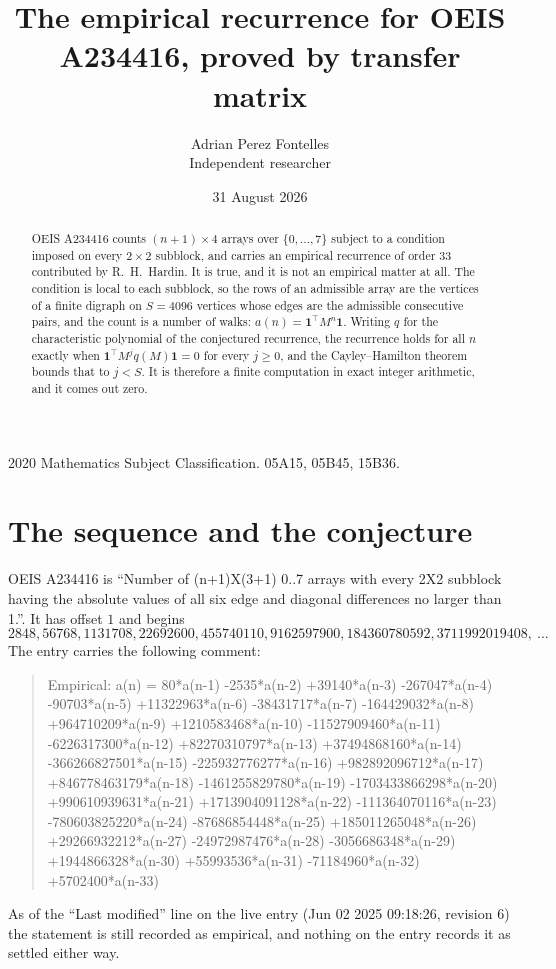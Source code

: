 \documentclass[11pt,a4paper]{article}
\title{The empirical recurrence for OEIS A234416, proved by transfer matrix}
\author{Adrian Perez Fontelles\\ \small Independent researcher}
\date{31 August 2026}
\theoremstyle{plain}
\theoremstyle{definition}
\begin{document}
\maketitle

\begin{abstract}
OEIS A234416 counts $(n+1)\times4$ arrays over $\{0,\dots,7\}$ subject to a condition imposed on
every $2\times2$ subblock, and carries an empirical recurrence of order $33$ contributed
by R.~H.~Hardin. It is true, and it is not an empirical matter at all. The condition is local
to each subblock, so the rows of an admissible array are the vertices of a finite digraph
on $S=4096$ vertices whose edges are the admissible consecutive pairs, and the count is a
number of walks: $a(n)=\mathbf{1}^{\!\top}M^{n}\mathbf{1}$. Writing $q$
for the characteristic polynomial of the conjectured recurrence, the recurrence holds for all
$n$ exactly when $\mathbf{1}^{\!\top}M^{j}q(M)\mathbf{1}=0$ for every $j\ge0$, and the
Cayley--Hamilton theorem bounds that to $j<S$. It is therefore a finite computation in exact
integer arithmetic, and it comes out zero.
\end{abstract}

\noindent\small 2020 Mathematics Subject Classification. 05A15, 05B45, 15B36.\normalsize

\section{The sequence and the conjecture}

OEIS A234416 is ``Number of (n+1)X(3+1) 0..7 arrays with every 2X2 subblock having the absolute values of all six edge and diagonal differences no larger than 1.''. It has offset $1$ and begins
\[
2848, 56768, 1131708, 22692600, 455740110, 9162597900, 184360780592, 3711992019408,\ \dots
\]
The entry carries the following comment:
\begin{quote}\small
Empirical: a(n) = 80*a(n-1) -2535*a(n-2) +39140*a(n-3) -267047*a(n-4) -90703*a(n-5) +11322963*a(n-6) -38431717*a(n-7) -164429032*a(n-8) +964710209*a(n-9) +1210583468*a(n-10) -11527909460*a(n-11) -6226317300*a(n-12) +82270310797*a(n-13) +37494868160*a(n-14) -366266827501*a(n-15) -225932776277*a(n-16) +982892096712*a(n-17) +846778463179*a(n-18) -1461255829780*a(n-19) -1703433866298*a(n-20) +990610939631*a(n-21) +1713904091128*a(n-22) -111364070116*a(n-23) -780603825220*a(n-24) -87686854448*a(n-25) +185011265048*a(n-26) +29266932212*a(n-27) -24972987476*a(n-28) -3056686348*a(n-29) +1944866328*a(n-30) +55993536*a(n-31) -71184960*a(n-32) +5702400*a(n-33)
\end{quote}
As of the ``Last modified'' line on the live entry (Jun 02 2025 09:18:26, revision 6) the statement is
still recorded as empirical, and nothing on the entry records it as settled either way.
\end{document}
